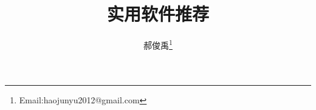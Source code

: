\documentclass[10pt,a4paper]{article}
\begin{document}
\begin{CJK*}{UTF8}{gkai}
\title{实用软件推荐}						   						%
\author{郝俊禹\thanks{Email:haojunyu2012@gmail.com}}				%
\date{}                                             				%
\maketitle                                          				%
\tableofcontents 												%
\clearpage





\clearpage     
\end{CJK*}
\end{document}

